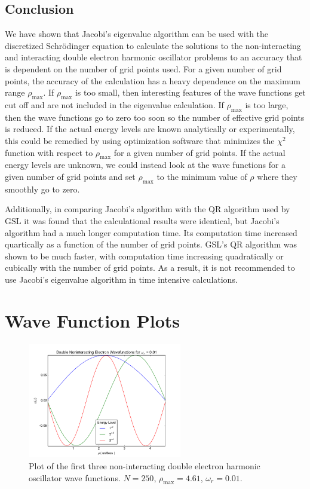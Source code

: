 \documentclass[a4paper,12pt]{report}
\begin{document}
\section{Conclusion}\label{sec:conclusion}
We have shown that Jacobi's eigenvalue algorithm can be used with the discretized Schr\"odinger equation to calculate the solutions to the non-interacting and interacting double electron harmonic oscillator problems to an accuracy that is dependent on the number of grid points used. For a given number of grid points, the accuracy of the calculation has a heavy dependence on the maximum range $\rho_{\mathrm{max}}$. If $\rho_{\mathrm{max}}$ is too small, then interesting features of the wave functions get cut off and are not included in the eigenvalue calculation. If $\rho_{\mathrm{max}}$ is too large, then the wave functions go to zero too soon so the number of effective grid points is reduced. If the actual energy levels are known analytically or experimentally, this could be remedied by using optimization software that minimizes the $\chi^2$ function with respect to $\rho_{\mathrm{max}}$ for a given number of grid points. If the actual energy levels are unknown, we could instead look at the wave functions for a given number of grid points and set $\rho_{\mathrm{max}}$ to the minimum value of $\rho$ where they smoothly go to zero. 

Additionally, in comparing Jacobi's algorithm with the QR algorithm used by GSL it was found that the calculational results were identical, but Jacobi's algorithm had a much longer computation time. Its computation time increased quartically as a function of the number of grid points. GSL's QR algorithm was shown to be much faster, with computation time increasing quadratically or cubically with the number of grid points. As a result, it is not recommended to use Jacobi's eigenvalue algorithm in time intensive calculations.

\appendix
{}
\chapter{Wave Function Plots}\label{app:wf}
\begin{figure}
\centering
 \includegraphics[width=0.6\textwidth]{SeHoWfWr001.png}
 \caption{Plot of the first three non-interacting double electron harmonic oscillator wave functions. $N = 250$, $\rho_{\mathrm{max}} = 4.61$, $\omega_r = 0.01$.}
 \label{fig:se001}
\end{figure}
\end{document}
